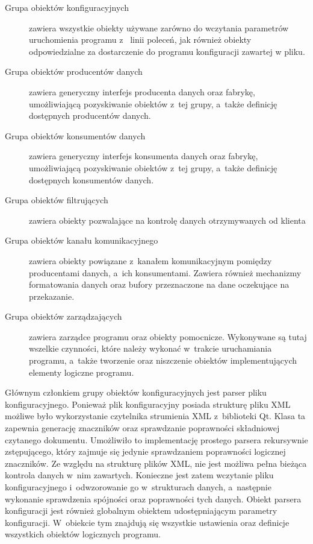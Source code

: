\begin{description}
\item[Grupa obiektów konfiguracyjnych] zawiera wszystkie obiekty
  używane zarówno do wczytania parametrów uruchomienia programu z~
  linii poleceń, jak również obiekty odpowiedzialne za dostarczenie do
  programu konfiguracji zawartej w pliku.
\item[Grupa obiektów producentów danych] zawiera generyczny interfejs
  producenta danych oraz fabrykę, umożliwiającą pozyskiwanie obiektów
  z~tej grupy, a~także definicję dostępnych producentów danych.
\item[Grupa obiektów konsumentów danych] zawiera generyczny interfejs
  konsumenta danych oraz fabrykę, umożliwiającą pozyskiwanie obiektów
  z~tej grupy, a~także definicję dostępnych konsumentów danych.
\item[Grupa obiektów filtrujących] zawiera obiekty pozwalające na
  kontrolę danych otrzymywanych od klienta
\item[Grupa obiektów kanału komunikacyjnego] zawiera obiekty powiązane
  z~kanałem komunikacyjnym pomiędzy producentami danych, a~ich
  konsumentami. Zawiera również mechanizmy formatowania danych oraz
  bufory przeznaczone na dane oczekujące na przekazanie.
\item[Grupa obiektów zarządzających] zawiera zarządce programu oraz
  obiekty pomocnicze. Wykonywane są tutaj wszelkie czynności, które
  należy wykonać w~trakcie uruchamiania programu, a~także tworzenie
  oraz niszczenie obiektów implementujących elementy logiczne
  programu.
\end{description}

Głównym członkiem grupy obiektów konfiguracyjnych jest parser pliku
konfiguracyjnego. Ponieważ plik konfiguracyjny posiada strukturę pliku
XML możliwe było wykorzystanie czytelnika strumienia XML z~biblioteki
Qt. Klasa ta zapewnia generację znaczników oraz sprawdzanie
poprawności składniowej czytanego dokumentu. Umożliwiło to
implementację prostego parsera rekursywnie zstępującego, który zajmuje
się jedynie sprawdzaniem poprawności logicznej znaczników. Ze względu
na strukturę plików XML, nie jest możliwa pełna bieżąca kontrola
danych w~nim zawartych. Konieczne jest zatem wczytanie pliku
konfiguracyjnego i~odwzorowanie go w~strukturach danych, a~następnie
wykonanie sprawdzenia spójności oraz poprawności tych danych. Obiekt
parsera konfiguracji jest również globalnym obiektem udostępniającym
parametry konfiguracji. W~obiekcie tym znajdują się wszystkie
ustawienia oraz definicje wszystkich obiektów logicznych programu.

